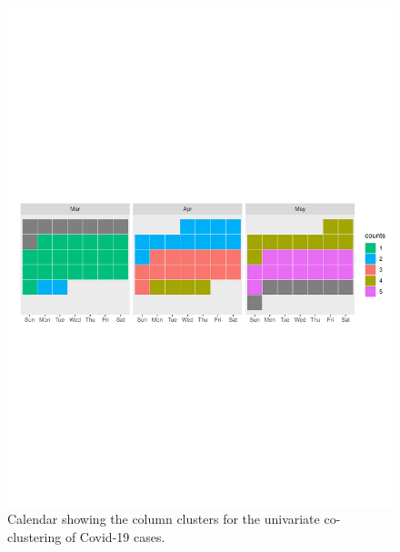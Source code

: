 \documentclass[12pt,a4paper]{article}
\begin{document}
\begin{figure}[H]
	\begin{center}
		\includegraphics[width=\columnwidth]{Cases_calendar.pdf}
		\caption{Calendar showing the column clusters for the univariate co-clustering of Covid-19 cases.}
		
	\end{center}
\end{figure}
\end{document}
